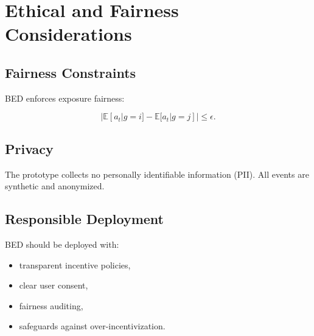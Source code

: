 \chapter{Ethical and Fairness Considerations}

\section{Fairness Constraints}

BED enforces exposure fairness:


\[
|\mathbb{E}[a_t | g=i] - \mathbb{E}[a_t | g=j]| \le \epsilon.
\]



\section{Privacy}

The prototype collects no personally identifiable information (PII).
All events are synthetic and anonymized.

\section{Responsible Deployment}

BED should be deployed with:
\begin{itemize}
    \item transparent incentive policies,
    \item clear user consent,
    \item fairness auditing,
    \item safeguards against over-incentivization.
\end{itemize}
